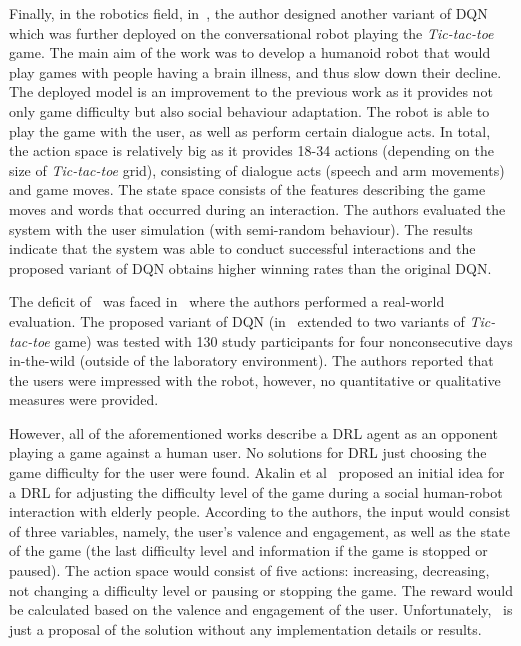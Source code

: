 \documentclass[thesis]{mas_proposal}
\begin{document}
Finally, in the robotics field, in~\cite{Cuayahuitl2017}, the author designed another variant of DQN which was further deployed on the conversational robot playing the \emph{Tic-tac-toe} game. The main aim of the work was to develop a humanoid robot that would play games with people having a brain illness, and thus slow down their decline. The deployed model is an improvement to the previous work as it provides not only game difficulty but also social behaviour adaptation. The robot is able to play the game with the user, as well as perform certain dialogue acts. In total, the action space is relatively big as it provides 18-34 actions (depending on the size of \emph{Tic-tac-toe} grid), consisting of dialogue acts (speech and arm movements) and game moves. The state space consists of the features describing the game moves and words that occurred during an interaction. The authors evaluated the system with the user simulation (with semi-random behaviour). The results indicate that the system was able to conduct successful interactions and the proposed variant of DQN obtains higher winning rates than the original DQN.

The deficit of~\cite{Cuayahuitl2017} was faced in~\cite{Cuayahuitl2020} where the authors performed a real-world evaluation. The proposed variant of DQN (in~\cite{Cuayahuitl2020} extended to two variants of \emph{Tic-tac-toe} game) was tested with 130 study participants for four nonconsecutive days in-the-wild (outside of the laboratory environment). The authors reported that the users were impressed with the robot, however, no quantitative or qualitative measures were provided.

However, all of the aforementioned works describe a DRL agent as an opponent playing a game against a human user. No solutions for DRL just choosing the game difficulty for the user were found. Akalin et al~\cite{Akalin2018} proposed an initial idea for a DRL for adjusting the difficulty level of the game during a social human-robot interaction with elderly people. According to the authors, the input would consist of three variables, namely, the user's valence and engagement, as well as the state of the game (the last difficulty level and information if the game is stopped or paused). The action space would consist of five actions: increasing, decreasing, not changing a difficulty level or pausing or stopping the game. The reward would be calculated based on the valence and engagement of the user. Unfortunately,~\cite{Akalin2018} is just a proposal of the solution without any implementation details or results.
\end{document}
